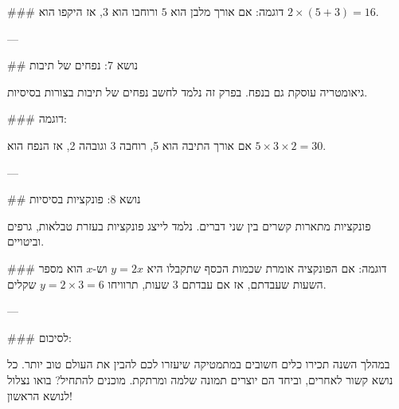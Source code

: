 ### דוגמה:
אם אורך מלבן הוא $5$ ורוחבו הוא $3$, אז היקפו הוא $2 \times (5 + 3) = 16$.

---

## נושא 7: נפחים של תיבות

גיאומטריה עוסקת גם בנפח. בפרק זה נלמד לחשב נפחים של תיבות בצורות בסיסיות.

### דוגמה:

אם אורך התיבה הוא 5, רוחבה 3 וגובהה 2, אז הנפח הוא $5 \times 3 \times 2 = 30$.

---

## נושא 8: פונקציות בסיסיות

פונקציות מתארות קשרים בין שני דברים. נלמד לייצג פונקציות בעזרת טבלאות, גרפים וביטויים.

### דוגמה:
אם הפונקציה אומרת שכמות הכסף שתקבלו היא $y = 2x$ וש-$x$ הוא מספר השעות שעבדתם, אז אם עבדתם 3 שעות, תרוויחו $y = 2 \times 3 = 6$ שקלים.

---

### לסיכום:

במהלך השנה תכירו כלים חשובים במתמטיקה שיעזרו לכם להבין את העולם טוב יותר. כל נושא קשור לאחרים, וביחד הם יוצרים תמונה שלמה ומרתקת. מוכנים להתחיל? בואו נצלול לנושא הראשון!

